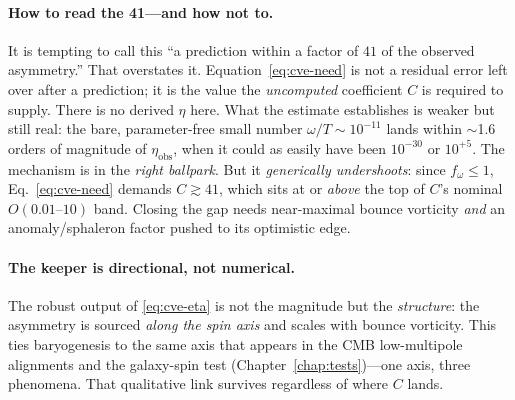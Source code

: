 \paragraph{How to read the 41---and how not to.} It is tempting to call this ``a
prediction within a factor of $41$ of the observed asymmetry.'' That overstates
it. Equation~\eqref{eq:cve-need} is not a residual error left over after a
prediction; it is the value the \emph{uncomputed} coefficient $C$ is required to
supply. There is no derived $\eta$ here. What the estimate establishes is weaker
but still real: the bare, parameter-free small number
$\omega/T\sim10^{-11}$ lands within $\sim$1.6 orders of magnitude of
$\eta_{\mathrm{obs}}$, when it could as easily have been $10^{-30}$ or $10^{+5}$.
The mechanism is in the \emph{right ballpark}. But it \emph{generically
undershoots}: since $f_\omega\le1$, Eq.~\eqref{eq:cve-need} demands $C\gtrsim41$,
which sits at or \emph{above} the top of $C$'s nominal $O(0.01\text{--}10)$ band.
Closing the gap needs near-maximal bounce vorticity \emph{and} an anomaly/sphaleron
factor pushed to its optimistic edge.

\paragraph{The keeper is directional, not numerical.} The robust output of
\eqref{eq:cve-eta} is not the magnitude but the \emph{structure}: the asymmetry is
sourced \emph{along the spin axis} and scales with bounce vorticity. This ties
baryogenesis to the same axis that appears in the CMB low-multipole alignments and
the galaxy-spin test (Chapter~\ref{chap:tests})---one axis, three phenomena. That
qualitative link survives regardless of where $C$ lands.

